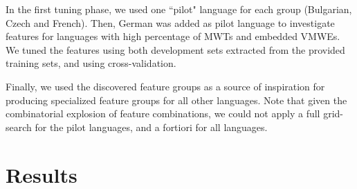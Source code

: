 \documentclass[output=paper,modfonts]{langscibook}
\begin{document}
In the first tuning phase, we used one ``pilot" language for each group (Bulgarian, Czech and French). Then, German was added as pilot language to investigate features for languages with high percentage of MWTs and embedded VMWEs. We tuned the features using both development sets extracted from the provided training sets, and using cross-validation.

Finally, we used the discovered feature groups as a source of inspiration for producing specialized feature groups for all other languages. Note that given the combinatorial explosion of feature combinations, we could not apply a full grid-search for the pilot languages, and a fortiori for all languages.
\section{Results}
\label{sec:results}
\end{document}

